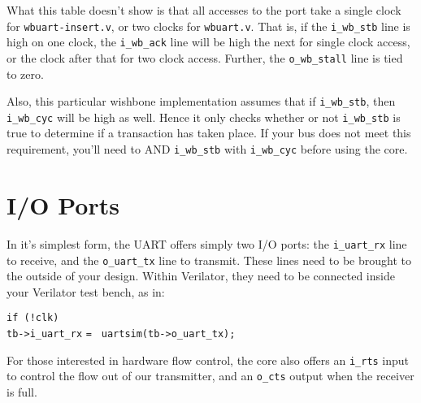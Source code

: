 \documentclass{gqtekspec}
\begin{document}
What this table doesn't show is that all accesses to the port take a single
clock for {\tt wbuart-insert.v}, or two clocks for {\tt wbuart.v}.  That is, if
the {\tt i\_wb\_stb} line is high on one clock, the {\tt i\_wb\_ack} line will
be high the next for single clock access, or the clock after that for two
clock access.  Further, the {\tt o\_wb\_stall} line is tied to zero. 

Also, this particular wishbone implementation assumes that if {\tt i\_wb\_stb},
then {\tt i\_wb\_cyc} will be high as well.  Hence it only checks whether or not
{\tt i\_wb\_stb} is true to determine if a transaction has taken place.  If your
bus does not meet this requirement, you'll need to AND {\tt i\_wb\_stb} with
{\tt i\_wb\_cyc} before using the core.

\chapter{I/O Ports}\label{ch:ioports}

In it's simplest form, the UART offers simply two I/O ports: the
{\tt i\_uart\_rx} line to receive, and the {\tt o\_uart\_tx} line to transmit.
These lines need to be brought to the outside of your design.  Within
Verilator, they need to be connected inside your Verilator test bench, as in:
\begin{tabbing}
{\tt if (!clk)} \= \\
\> {\tt tb->i\_uart\_rx} {\tt = } {\tt uartsim(tb->o\_uart\_tx);}
\end{tabbing}

For those interested in hardware flow control, the core also offers an
{\tt i\_rts} input to control the flow out of our transmitter, and an
{\tt o\_cts} output when the receiver is full.
\end{document}
